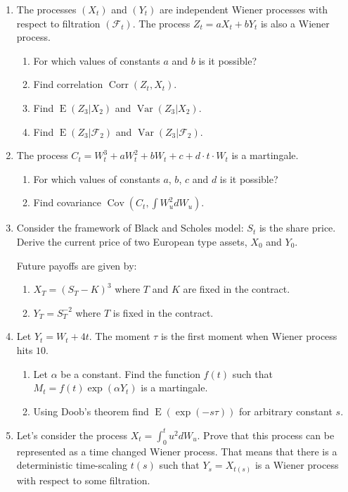 \documentclass[12pt]{article}
\DeclareMathOperator{\Cov}{Cov}
\DeclareMathOperator{\Corr}{Corr}
\DeclareMathOperator{\Var}{Var}
\DeclareMathOperator{\E}{E}
\begin{document}
\begin{enumerate}

\item The processes $(X_t)$ and $(Y_t)$ are independent Wiener processes with respect to filtration $(\mathcal{F}_t)$.
The process $Z_t = aX_t + b Y_t$ is also a Wiener process. 
\begin{enumerate}
  \item For which values of constants $a$ and $b$ is it possible?
  \item Find correlation $\Corr(Z_t, X_t)$.
  \item Find $\E(Z_3 | X_2)$ and $\Var(Z_3 | X_2)$.
  \item Find $\E(Z_3 | \mathcal{F}_2)$ and $\Var(Z_3 | \mathcal{F}_2)$.
\end{enumerate}


\item The process $C_t = W_t^3 + aW_t^2 +b W_t + c + d\cdot t\cdot W_t$ is a martingale.
\begin{enumerate}
  \item For which values of constants $a$, $b$, $c$ and $d$ is it possible?
  \item Find covariance $\Cov(C_t, \int W^2_u dW_u)$.
\end{enumerate}

\item Consider the framework of Black and Scholes model: $S_t$ is the share price. 
Derive the current price of two European type assets, $X_0$ and $Y_0$. 

Future payoffs are given by:
\begin{enumerate}
  \item $X_T = (S_T - K)^3$ where $T$ and $K$ are fixed in the contract.
  \item $Y_T = S_T^{-2}$ where $T$ is fixed in the contract. 
\end{enumerate}

\item Let $Y_t = W_t + 4t$. The moment $\tau$ is the first moment when Wiener process hits $10$. 
\begin{enumerate}
  \item Let $\alpha$ be a constant. Find the function $f(t)$ such that $M_t = f(t)\exp(\alpha Y_t)$ is a martingale.
  \item Using Doob's theorem find $\E(\exp(-s \tau))$ for arbitrary constant $s$. 
\end{enumerate}

\item Let's consider the process $X_t = \int_0^t u^2 dW_u$. 
Prove that this process can be represented as a time changed Wiener process. 
That means that there is a deterministic time-scaling $t(s)$ 
such that $Y_s = X_{t(s)}$ is a Wiener process with respect to some filtration. 


\end{enumerate}
\end{document}
